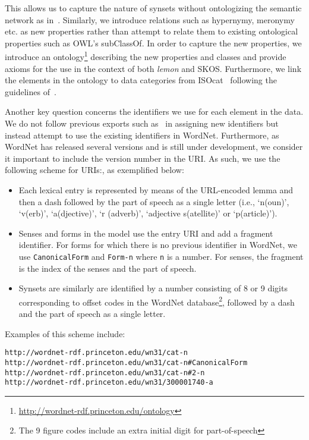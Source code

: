 \documentclass[10pt, a4paper]{article}
\newcommand{\lemon}[0]{\emph{lemon}}
\begin{document}
This allows us to capture the nature of synsets without
ontologizing the semantic network as in~\cite{gangemi2003ontowordnet}.
Similarly, we introduce relations such as hypernymy, meronymy etc. as new
properties rather than attempt to relate them to existing ontological
properties such as OWL's subClassOf. In order to capture the new properties, we
introduce an ontology\footnote{\url{http://wordnet-rdf.princeton.edu/ontology}}
describing the new properties and classes and provide
axioms for the use in the context of both \lemon{} and SKOS. Furthermore, we
link the elements in the ontology to data categories from
ISOcat~\cite{kemps2008isocat} following the guidelines
of~\cite{windhouwer2012linking}.

Another key question concerns the identifiers we use for each element in the data.
We do not follow previous exports such as~\cite{van2006conversion} in assigning new identifiers
but instead attempt to use the existing identifiers in WordNet. Furthermore, as
WordNet has released several versions and is still under development, we consider it 
important to include the version number in the URI. As such, we use the
following scheme for URIs:, as exemplified below:

\begin{itemize}
  \item Each lexical entry is represented by means of the URL-encoded lemma and
    then a dash followed by the part of speech as a single letter (i.e., `n(oun)',
    `v(erb)', `a(djective)', `r (adverb)', `adjective s(atellite)' or `p(article)').    
    
  \item Senses and forms in the model use the entry URI and add a fragment identifier. For forms for which there is no previous identifier in WordNet, we
    use {\tt CanonicalForm} and {\tt Form-n} where {\tt n} is a number.
    For senses, the fragment is the index of the senses and the part of
    speech.
  \item Synsets are similarly are identified by a number consisting of 8 or 9 digits corresponding to offset codes in the WordNet database\footnote{The 9 figure codes
      include an extra initial digit for part-of-speech}, followed by a dash and the part of speech as a single letter.
\end{itemize}

Examples of this scheme include:

{\scriptsize
\begin{verbatim}
http://wordnet-rdf.princeton.edu/wn31/cat-n
http://wordnet-rdf.princeton.edu/wn31/cat-n#CanonicalForm
http://wordnet-rdf.princeton.edu/wn31/cat-n#2-n
http://wordnet-rdf.princeton.edu/wn31/300001740-a
\end{verbatim}}
\end{document}
